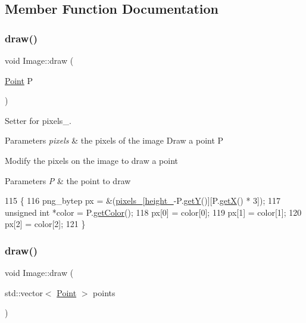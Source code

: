 \subsection{Member Function Documentation}
\mbox{\label{class_image_a8d162f3cab956131d58708c09aa560b0}} 
\subsubsection{\texorpdfstring{draw()}{draw()}\hspace{0.1cm}{\footnotesize\ttfamily [1/3]}}
{\footnotesize\ttfamily void Image\+::draw (\begin{DoxyParamCaption}\item[{\mbox{\hyperlink{class_point}{Point}}}]{P }\end{DoxyParamCaption})}



Setter for pixels\+\_\+. 


\begin{DoxyParams}{Parameters}
{\em pixels} & the pixels of the image Draw a point P\\
\hline
\end{DoxyParams}
Modify the pixels on the image to draw a point 
\begin{DoxyParams}{Parameters}
{\em P} & the point to draw \\
\hline
\end{DoxyParams}

\begin{DoxyCode}
115                         \{
116     png\_bytep px = \&(\mbox{\hyperlink{class_image_a51351c8507499d09cb9667c20ef01faf}{pixels\_}}[\mbox{\hyperlink{class_image_a64a699c5bb8e8a18c6971a8032806dba}{height\_}}-P.\mbox{\hyperlink{class_point_a86d10ff46e08462c45b15a8c7ef62d61}{getY}}()][P.\mbox{\hyperlink{class_point_ac9d5859db121c7d1b89ca89266dca0a3}{getX}}() * 3]);
117     \textcolor{keywordtype}{unsigned} \textcolor{keywordtype}{int} *color = P.\mbox{\hyperlink{class_point_a1aa902dd929328baec8c8f6970284ac2}{getColor}}();
118     px[0] = color[0];
119     px[1] = color[1];
120     px[2] = color[2];
121 \}
\end{DoxyCode}
\mbox{\label{class_image_aecc7a0365eb204dba714a71bcb86361d}} 
\subsubsection{\texorpdfstring{draw()}{draw()}\hspace{0.1cm}{\footnotesize\ttfamily [2/3]}}
{\footnotesize\ttfamily void Image\+::draw (\begin{DoxyParamCaption}\item[{std\+::vector$<$ \mbox{\hyperlink{class_point}{Point}} $>$}]{points }\end{DoxyParamCaption})}



